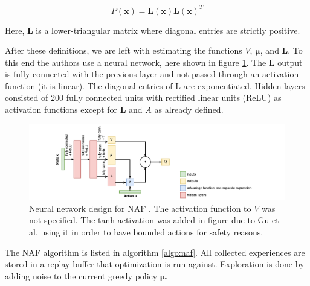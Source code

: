 \begin{equation}
    P(\mathbf{x}) = \mathbf{L(x)L(x)}^T
\end{equation}

Here, $\mathbf{L}$ is a lower-triangular matrix where diagonal entries are
strictly positive.

After these definitions, we are left with estimating the functions $V$,
$\mathbf{\mu}$, and $\mathbf{L}$. To this end the authors use a neural network,
here shown in figure \ref{fig:naf-net}. The $\mathbf{L}$ output is fully
connected with the previous layer and not passed through an activation function
(it is linear). The diagonal entries of L are exponentiated. Hidden layers
consisted of 200 fully connected units with rectified linear units (ReLU) as
activation functions except for $\mathbf{L}$ and $A$ as already defined.

\begin{figure}[h]
    \centering
    \includegraphics[width=1.0\textwidth]{res/naf-net.pdf}

    \caption{Neural network design for NAF \cite{gu2016continuous}. The
    activation function to $V$ was not specified. The tanh activation was added
    in figure due to Gu et al. \cite{gu2016deep} using it in order to have
    bounded actions for safety reasons.}

    \label{fig:naf-net}
\end{figure}

The NAF algorithm is listed in algorithm \ref{algo:naf}. All collected experiences
are stored in a replay buffer that optimization is run against. Exploration is done
by adding noise to the current greedy policy $\mathbf{\mu}$.

